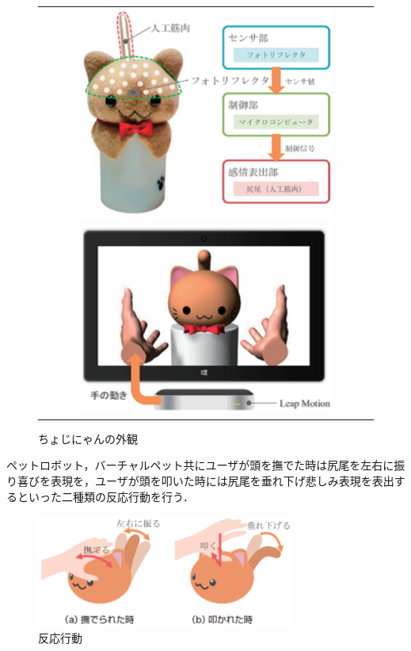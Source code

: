 \begin{figure}[H]
\centering
\begin{tabular}{c}

\begin{minipage}{0.50\hsize}
\includegraphics*[width=8.5cm,clip]{images/先行研究1.eps}
\caption{ちょぼにゃんの外観}
\label{fig:system1}
\end{minipage}

\begin{minipage}{0.50\hsize}
\centering
\includegraphics*[width=8.5cm,clip]{images/先行研究2.eps}
\caption{ちょじにゃんの外観}
\label{fig:system2}
\end{minipage}

\end{tabular}
\end{figure} 

ペットロボット，バーチャルペット共にユーザが頭を撫でた時は尻尾を左右に振り喜びを表現を，ユーザが頭を叩いた時には尻尾を垂れ下げ悲しみ表現を表出するといった二種類の反応行動を行う．
\newpage

\begin{figure}[H]
\centering
\includegraphics*[width=8.5cm,clip]{images/先行研究3.eps}
\caption{反応行動}
\label{fig:system3}
\end{figure} 

